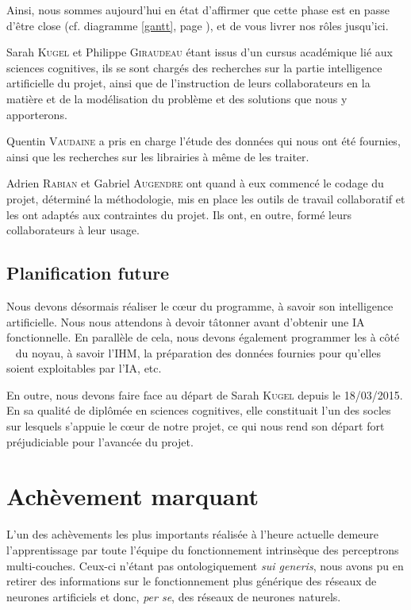 \documentclass[a4paper, 12pt]{article}
\begin{document}
Ainsi, nous sommes aujourd'hui en état d'affirmer que cette phase est en passe d'être close (cf. diagramme \ref{gantt}, page \pageref{gantt}), et de vous livrer nos rôles jusqu'ici.

Sarah \textsc{Kugel} et Philippe \textsc{Giraudeau} étant issus d'un cursus académique lié aux sciences cognitives, ils se sont chargés des recherches sur la partie intelligence artificielle du projet, ainsi que de l'instruction de leurs collaborateurs en la matière et de la modélisation du problème et des solutions que nous y apporterons.

Quentin \textsc{Vaudaine} a pris en charge l'étude des données qui nous ont été fournies, ainsi que les recherches sur les librairies à même de les traiter.

Adrien \textsc{Rabian} et Gabriel \textsc{Augendre} ont quand à eux commencé le codage du projet, déterminé la méthodologie, mis en place les outils de travail collaboratif et les ont adaptés aux contraintes du projet. Ils ont, en outre, formé leurs collaborateurs à leur usage.

\subsection{Planification future}
Nous devons désormais réaliser le cœur du programme, à savoir son intelligence artificielle. Nous nous attendons à devoir tâtonner avant d'obtenir une IA fonctionnelle. En parallèle de cela, nous devons également programmer les \og à côté \fg ~ du noyau, à savoir l'IHM, la préparation des données fournies pour qu'elles soient exploitables par l'IA, etc.

En outre, nous devons faire face au départ de Sarah \textsc{Kugel} depuis le 18/03/2015. En sa qualité de diplômée en sciences cognitives, elle constituait l'un des socles sur lesquels s'appuie le cœur de notre projet, ce qui nous rend son départ fort préjudiciable pour l'avancée du projet.

\section{Achèvement marquant}
L'un des achèvements les plus importants réalisée à l'heure actuelle demeure l'apprentissage par toute l'équipe du fonctionnement intrinsèque des perceptrons multi-couches. Ceux-ci n'étant pas ontologiquement \textit{sui generis}, nous avons pu en retirer des informations sur le fonctionnement plus générique des réseaux de neurones artificiels et donc, \textit{per se}, des réseaux de neurones naturels.
\end{document}
